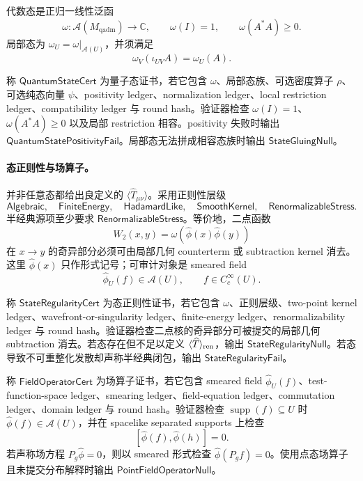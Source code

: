 代数态是正归一线性泛函
\[
\omega:\mathcal A(M_{\mathrm{qadm}})\to\mathbb C,
\qquad
\omega(I)=1,\qquad
\omega(A^*A)\ge0.
\]
局部态为 \(\omega_U=\omega|_{\mathcal A(U)}\)，并须满足
\[
\omega_V(\iota_{UV}A)=\omega_U(A).
\]

\begin{definition}[量子态证书]\label{def:typed-address-biaxial-completion-quantum-state-cert}
称 \(\mathsf{QuantumStateCert}\) 为量子态证书，若它包含 \(\omega\)、局部态族、可选密度算子 \(\rho\)、可选纯态向量 \(\psi\)、positivity ledger、normalization ledger、local restriction ledger、compatibility ledger 与 round hash。验证器检查 \(\omega(I)=1\)、\(\omega(A^*A)\ge0\) 以及局部 restriction 相容。positivity 失败时输出 \(\mathsf{QuantumStatePositivityFail}\)。局部态无法拼成相容态族时输出 \(\mathsf{StateGluingNull}\)。
\end{definition}

\paragraph{态正则性与场算子。}
并非任意态都给出良定义的 \(\langle\widehat T_{\mu\nu}\rangle\)。采用正则性层级
\[
\mathsf{Algebraic},\quad
\mathsf{FiniteEnergy},\quad
\mathsf{HadamardLike},\quad
\mathsf{SmoothKernel},\quad
\mathsf{RenormalizableStress}.
\]
半经典源项至少要求 \(\mathsf{RenormalizableStress}\)。等价地，二点函数
\[
W_2(x,y)=\omega(\widehat\phi(x)\widehat\phi(y))
\]
在 \(x\to y\) 的奇异部分必须可由局部几何 counterterm 或 subtraction kernel 消去。这里 \(\widehat\phi(x)\) 只作形式记号；可审计对象是 smeared field
\[
\widehat\phi_U(f)\in\mathcal A(U),
\qquad
f\in C_c^\infty(U).
\]

\begin{definition}[态正则性证书]\label{def:typed-address-biaxial-completion-state-regularity-cert}
称 \(\mathsf{StateRegularityCert}\) 为态正则性证书，若它包含 \(\omega\)、正则层级、two-point kernel ledger、wavefront-or-singularity ledger、finite-energy ledger、renormalizability ledger 与 round hash。验证器检查二点核的奇异部分可被提交的局部几何 subtraction 消去。若态存在但不足以定义 \(\langle\widehat T\rangle_{\rm ren}\)，输出 \(\mathsf{StateRegularityNull}\)。若态导致不可重整化发散却声称半经典闭包，输出 \(\mathsf{StateRegularityFail}\)。
\end{definition}

\begin{definition}[场算子证书]\label{def:typed-address-biaxial-completion-field-operator-cert}
称 \(\mathsf{FieldOperatorCert}\) 为场算子证书，若它包含 smeared field \(\widehat\phi_U(f)\)、test-function-space ledger、smearing ledger、field-equation ledger、commutation ledger、domain ledger 与 round hash。验证器检查 \(\operatorname{supp}(f)\subseteq U\) 时 \(\widehat\phi(f)\in\mathcal A(U)\)，并在 spacelike separated supports 上检查
\[
[\widehat\phi(f),\widehat\phi(h)]=0.
\]
若声称场方程 \(P_g\widehat\phi=0\)，则以 smeared 形式检查 \(\widehat\phi(P_gf)=0\)。使用点态场算子且未提交分布解释时输出 \(\mathsf{PointFieldOperatorNull}\)。
\end{definition}

